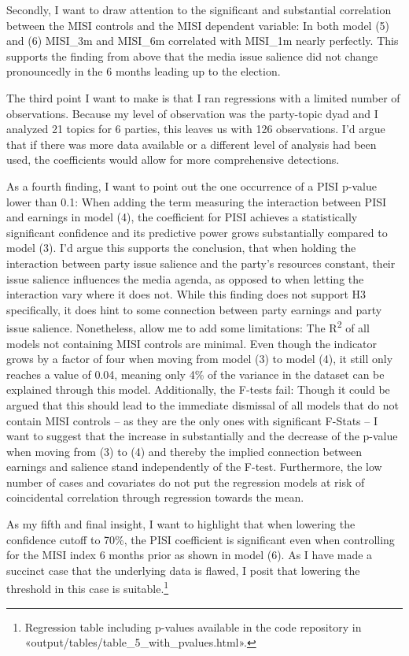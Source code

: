 \documentclass[11pt,a4paper]{article}
\begin{document}
Secondly, I want to draw attention to the significant and substantial correlation between the MISI controls and the MISI dependent variable: In both model (5) and (6) MISI\_3m and MISI\_6m correlated with MISI\_1m nearly perfectly. This supports the finding from above that the media issue salience did not change pronouncedly in the 6 months leading up to the election.

The third point I want to make is that I ran regressions with a limited number of observations. Because my level of observation was the party-topic dyad and I analyzed 21 topics for 6 parties, this leaves us with 126 observations. I’d argue that if there was more data available or a different level of analysis had been used, the coefficients would allow for more comprehensive detections.

As a fourth finding, I want to point out the one occurrence of a PISI p-value lower than 0.1: When adding the term measuring the interaction between PISI and earnings in model (4), the coefficient for PISI achieves a statistically significant confidence and its predictive power grows substantially compared to model (3). I’d argue this supports the conclusion, that when holding the interaction between party issue salience and the party’s resources constant, their issue salience influences the media agenda, as opposed to when letting the interaction vary where it does not. While this finding does not support H3 specifically, it does hint to some connection between party earnings and party issue salience. Nonetheless, allow me to add some limitations: The R\textsuperscript{2} of all models not containing MISI controls are minimal. Even though the indicator grows by a factor of four when moving from model (3) to model (4), it still only reaches a value of 0.04, meaning only 4\% of the variance in the dataset can be explained through this model. Additionally, the F-tests fail: Though it could be argued that this should lead to the immediate dismissal of all models that do not contain MISI controls – as they are the only ones with significant F-Stats – I want to suggest that the increase in substantially and the decrease of the p-value when moving from (3) to (4) and thereby the implied connection between earnings and salience stand independently of the F-test. Furthermore, the low number of cases and covariates do not put the regression models at risk of coincidental correlation through regression towards the mean.

As my fifth and final insight, I want to highlight that when lowering the confidence cutoff to 70\%, the PISI coefficient is significant even when controlling for the MISI index 6 months prior as shown in model (6). As I have made a succinct case that the underlying data is flawed, I posit that lowering the threshold in this case is suitable.\footnote{Regression table including p-values available in the code repository in «output/tables/table\_5\_with\_pvalues.html».}
\end{document}
